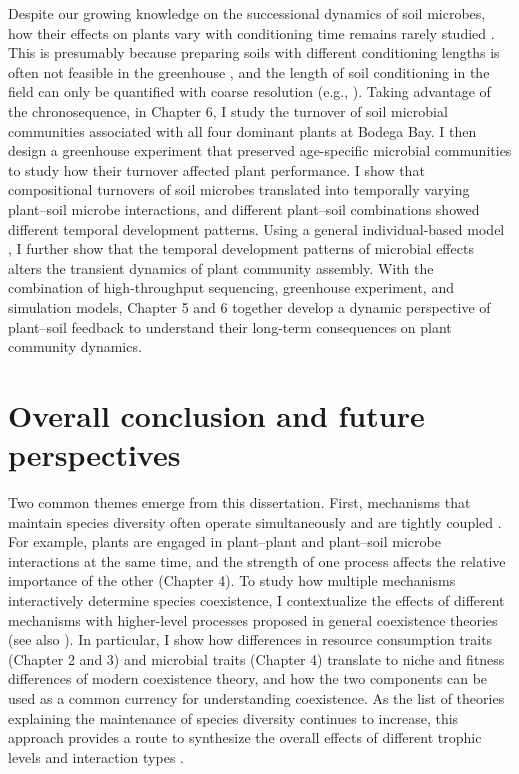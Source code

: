 Despite our growing knowledge on the successional dynamics of soil microbes, how their effects on plants vary with conditioning time remains rarely studied \citep{Kardol2013, Lepinay2018}. This is presumably because preparing soils with different conditioning lengths is often not feasible in the greenhouse \citep{Kardol2013, Kulmatiski2018}, and the length of soil conditioning in the field can only be quantified with coarse resolution (e.g., \citealp{Day2015, Speek2015}). 
Taking advantage of the chronosequence, in Chapter 6, I study the turnover of soil microbial communities associated with all four dominant plants at Bodega Bay. I then design a greenhouse experiment that preserved age-specific microbial communities to study how their turnover affected plant performance.
I show that compositional turnovers of soil microbes translated into temporally varying plant--soil microbe interactions, and different plant--soil combinations showed different temporal development patterns. 
Using a general individual-based model \citep{Fukami2013}, I further show that the temporal development patterns of microbial effects alters the transient dynamics of plant community assembly. 
With the combination of high-throughput sequencing, greenhouse experiment, and simulation models, Chapter 5 and 6 together develop a dynamic perspective of plant--soil feedback to understand their long-term consequences on plant community dynamics.
\par


\section{Overall conclusion and future perspectives}
Two common themes emerge from this dissertation. First, mechanisms that maintain species diversity often operate simultaneously and are tightly coupled \citep{Amarasekare2007, Letten2018}. For example, plants are engaged in plant--plant and plant--soil microbe interactions at the same time, and the strength of one process affects the relative importance of the other (Chapter 4). To study how multiple mechanisms interactively determine species coexistence, I contextualize the effects of different mechanisms with higher-level processes proposed in general coexistence theories (see also \citealp{Vellend2016}). In particular, I show how differences in resource consumption traits (Chapter 2 and 3) and microbial traits (Chapter 4) translate to niche and fitness differences of modern coexistence theory, and how the two components can be used as a common currency for understanding coexistence. As the list of theories explaining the maintenance of species diversity continues to increase, this approach provides a route to synthesize the overall effects of different trophic levels and interaction types \citep{Bartomeus2018, Lanuza2018}.
\par


